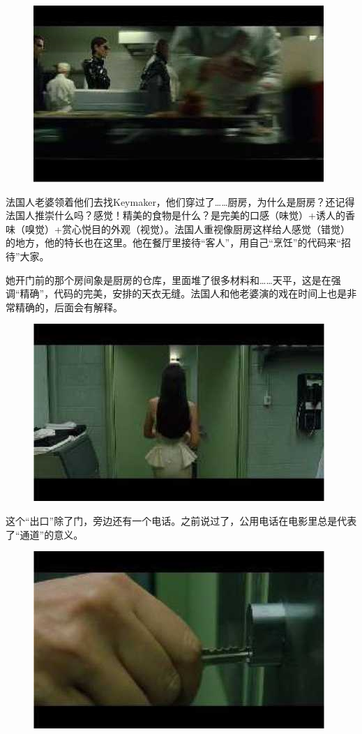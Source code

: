 \documentclass[UTF8]{ctexart}
\begin{document}
\begin{figure}[htb]
\centering
\includegraphics[width=0.5\linewidth]{fig/read_reloaded-108-1}
\end{figure}

法国人老婆领着他们去找Keymaker，他们穿过了……厨房，为什么是厨房？还记得法国人推崇什么吗？感觉！精美的食物是什么？是完美的口感（味觉）+诱人的香味（嗅觉）+赏心悦目的外观（视觉）。法国人重视像厨房这样给人感觉（错觉）的地方，他的特长也在这里。他在餐厅里接待“客人”，用自己“烹饪”的代码来“招待”大家。

她开门前的那个房间象是厨房的仓库，里面堆了很多材料和……天平，这是在强调“精确”，代码的完美，安排的天衣无缝。法国人和他老婆演的戏在时间上也是非常精确的，后面会有解释。

\begin{figure}[htb]
\centering
\includegraphics[width=0.5\linewidth]{fig/read_reloaded-109}
\end{figure}

这个“出口”除了门，旁边还有一个电话。之前说过了，公用电话在电影里总是代表了“通道”的意义。

\begin{figure}[htb]
\centering
\includegraphics[width=0.5\linewidth]{fig/read_reloaded-110}
\end{figure}
\end{document}
